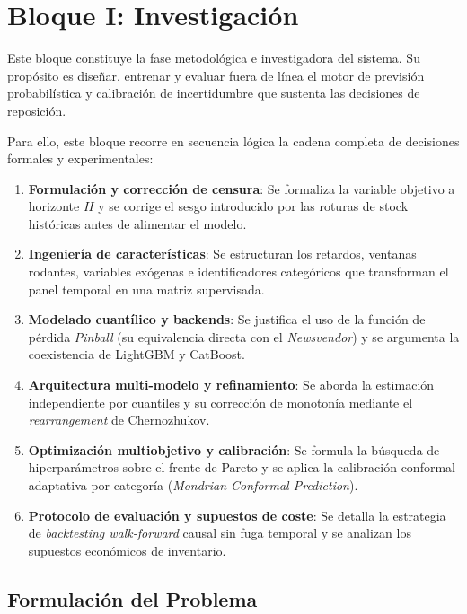 \section{Bloque I: Investigación}

Este bloque constituye la fase metodológica e investigadora del sistema. Su propósito es diseñar, entrenar y evaluar fuera de línea el motor de previsión probabilística y calibración de incertidumbre que sustenta las decisiones de reposición.

Para ello, este bloque recorre en secuencia lógica la cadena completa de decisiones formales y experimentales:
\begin{enumerate}
    \item \textbf{Formulación y corrección de censura}: Se formaliza la variable objetivo a horizonte $H$ y se corrige el sesgo introducido por las roturas de stock históricas antes de alimentar el modelo.
    \item \textbf{Ingeniería de características}: Se estructuran los retardos, ventanas rodantes, variables exógenas e identificadores categóricos que transforman el panel temporal en una matriz supervisada.
    \item \textbf{Modelado cuantílico y backends}: Se justifica el uso de la función de pérdida \textit{Pinball} (su equivalencia directa con el \textit{Newsvendor}) y se argumenta la coexistencia de LightGBM y CatBoost.
    \item \textbf{Arquitectura multi-modelo y refinamiento}: Se aborda la estimación independiente por cuantiles y su corrección de monotonía mediante el \textit{rearrangement} de Chernozhukov.
    \item \textbf{Optimización multiobjetivo y calibración}: Se formula la búsqueda de hiperparámetros sobre el frente de Pareto y se aplica la calibración conformal adaptativa por categoría (\textit{Mondrian Conformal Prediction}).
    \item \textbf{Protocolo de evaluación y supuestos de coste}: Se detalla la estrategia de \textit{backtesting walk-forward} causal sin fuga temporal y se analizan los supuestos económicos de inventario.
\end{enumerate}

\subsection{Formulación del Problema}

